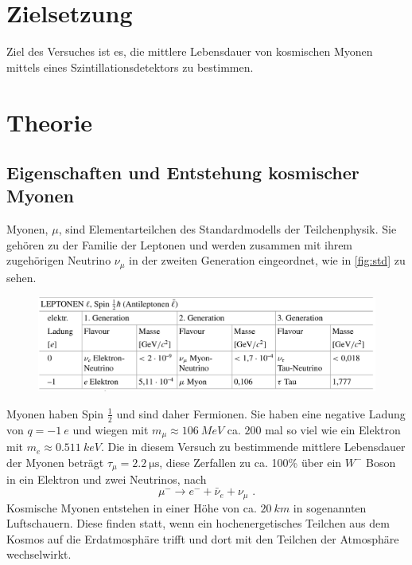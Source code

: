 \section{Zielsetzung}
\label{sec:Zielsetzung}
Ziel des Versuches ist es, die mittlere Lebensdauer von kosmischen Myonen mittels eines Szintillationsdetektors zu bestimmen. 

\section{Theorie}
\label{sec:Theorie}
\subsection{Eigenschaften und Entstehung kosmischer Myonen}
Myonen, $\mu$, sind Elementarteilchen des Standardmodells der Teilchenphysik. Sie gehören zu der Familie der Leptonen und werden zusammen mit ihrem zugehörigen Neutrino $\nu_\mu$ in der zweiten Generation eingeordnet, wie in \autoref{fig:std} zu sehen.
\begin{figure}[H]
    \centering
    \includegraphics[width=\linewidth]{data/leptonen_std.png}
    \label{fig:std}
\end{figure}
\noindent
Myonen haben Spin $\frac{1}{2}$ und sind daher Fermionen. Sie haben eine negative Ladung von $q = \SI{-1}{e}$ und wiegen mit $m_\mu \approx \SI{106}{MeV}$ ca. $200$ mal so viel wie ein Elektron mit $m_e \approx \SI{0.511}{keV}$. Die in diesem Versuch zu bestimmende mittlere Lebensdauer der Myonen beträgt $\tau_{\mu} = \SI{2.2}{\micro\second}$, diese Zerfallen zu ca. 100\% \cite{pdg} über ein $W^{-}$ Boson in ein Elektron und zwei Neutrinos, nach 
\begin{equation}
    \mu^- \rightarrow e^- + \bar{\nu}_e + \nu_\mu \, \, .
\end{equation}
Kosmische Myonen entstehen in einer Höhe von ca. $\SI{20}{km}$ in sogenannten Luftschauern. Diese finden statt, wenn ein hochenergetisches Teilchen aus dem Kosmos auf die Erdatmosphäre trifft und dort mit den Teilchen der Atmosphäre wechselwirkt.
